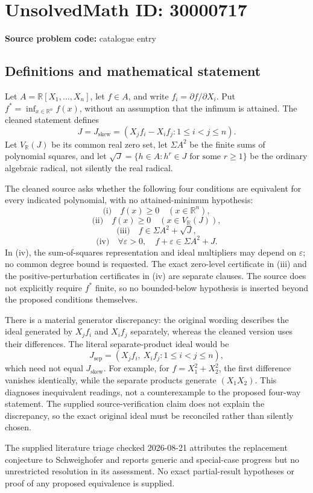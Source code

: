 \documentclass[11pt]{article}
\newcommand{\R}{\mathbb{R}}
\begin{document}
\section*{UnsolvedMath ID: 30000717}
\textbf{Source problem code:} catalogue entry
\subsection{Definitions and mathematical statement}
Let \(A=\R[X_1,\ldots,X_n]\), let \(f\in A\), and write \(f_i=\partial f/\partial X_i\). Put \(f^*=\inf_{x\in\R^n}f(x)\), without an assumption that the infimum is attained. The cleaned statement defines
\[
J=J_{\mathrm{skew}}=(X_jf_i-X_if_j:1\leq i<j\leq n).
\]
Let \(V_\R(J)\) be its common real zero set, let \(\Sigma A^2\) be the finite sums of polynomial squares, and let \(\sqrt J=\{h\in A:h^r\in J\text{ for some }r\geq1\}\) be the ordinary algebraic radical, not silently the real radical.

The cleaned source asks whether the following four conditions are equivalent for every indicated polynomial, with no attained-minimum hypothesis:
\[
\text{(i)}\quad f(x)\geq0\quad(x\in\R^n),
\]
\[
\text{(ii)}\quad f(x)\geq0\quad(x\in V_\R(J)),
\]
\[
\text{(iii)}\quad f\in\Sigma A^2+\sqrt J,
\]
\[
\text{(iv)}\quad\forall\varepsilon>0,\quad f+\varepsilon\in\Sigma A^2+J.
\]
In (iv), the sum-of-squares representation and ideal multipliers may depend on \(\varepsilon\); no common degree bound is requested. The exact zero-level certificate in (iii) and the positive-perturbation certificates in (iv) are separate clauses. The source does not explicitly require \(f^*\) finite, so no bounded-below hypothesis is inserted beyond the proposed conditions themselves.

There is a material generator discrepancy: the original wording describes the ideal generated by \(X_jf_i\) and \(X_if_j\) separately, whereas the cleaned version uses their differences. The literal separate-product ideal would be
\[
J_{\mathrm{sep}}=(X_jf_i,\ X_if_j:1\leq i<j\leq n),
\]
which need not equal \(J_{\mathrm{skew}}\). For example, for \(f=X_1^2+X_2^2\), the first difference vanishes identically, while the separate products generate \((X_1X_2)\). This diagnoses inequivalent readings, not a counterexample to the proposed four-way statement. The supplied source-verification claim does not explain the discrepancy, so the exact original ideal must be reconciled rather than silently chosen.

The supplied literature triage checked 2026-08-21 attributes the replacement conjecture to Schweighofer and reports generic and special-case progress but no unrestricted resolution in its assessment. No exact partial-result hypotheses or proof of any proposed equivalence is supplied.
\end{document}
